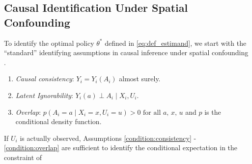 \documentclass[12pt]{article}
\newcommand{\CP}[1]{{\color{purple}From Chan: #1}}
\newcommand{\XL}[1]{{\color{blue}from Xindi: #1}}
\begin{document}
\subsection{Causal Identification Under Spatial Confounding} \label{sec:identify_spatial_confounding}
To identify the optimal policy $\theta^*$ defined in \eqref{eq:def_estimand}, we start with the ``standard'' identifying assumptions in causal inference under spatial confounding \citep{papadogeorgou2019adjusting, schnell2020mitigating, gilbert2021causal}. %
 \begin{enumerate}[label=(A\arabic*)]
     \item \emph{Causal consistency}:  $Y_i = Y_i(A_i)$ almost surely. \label{condition:consistency}
        \item 
        \emph{Latent Ignorability}: $Y_i(a) \perp A_i \mid X_i, U_i .$ \label{condition:ignorability}
        \item \emph{Overlap}: $p(A_i = a \mid X_i=x, U_i=u) > 0 \text{ for all $a$, $x$, $u$}$ and $p$ is the conditional density function. \label{condition:overlap} 
 \end{enumerate}
If $U_i$ is actually observed, Assumptions \ref{condition:consistency} - \ref{condition:overlap} are sufficient to identify the conditional expectation in the constraint of
\end{document}
